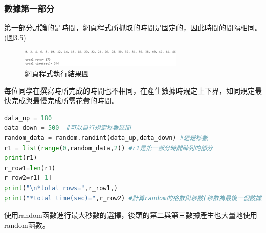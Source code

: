 \subsubsection{數據第一部分}
第一部分討論的是時間，網頁程式所抓取的時間是固定的，因此時間的間隔相同。(圖3.5)
	\begin{figure}[H] %
	\centering %
	\includegraphics[width=0.7\textwidth]{3_2_1_3.png} %
	\caption{網頁程式執行結果圖} %
	\label{Fig.3.5} %
	\end{figure}
每位同學在撰寫時所完成的時間也不相同，在產生數據時規定上下界，如同規定最快完成與最慢完成所需花費的時間。



\lstset{style=mystyle}

\begin{lstlisting}[language=Python,caption=python數據第一部分]
data_up = 180
data_down = 500  #可以自行規定秒數區間
random_data = random.randint(data_up,data_down) #這是秒數
r1 = list(range(0,random_data,2)) #r1是第一部分時間陣列的部分
print(r1)
r_row1=len(r1)
r_row2=r1[-1]
print("\n*total rows=",r_row1,)
print("*total time(sec)=",r_row2) #計算random的格數與秒數(秒數為最後一個數據)
\end{lstlisting}
使用random函數進行最大秒數的選擇，後頭的第二與第三數據產生也大量地使用random函數。

